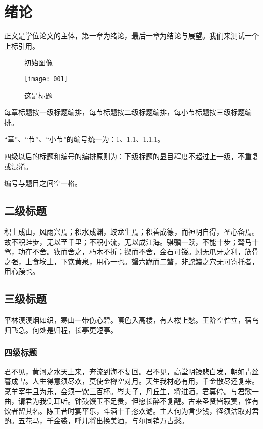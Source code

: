 
\section{绪论}


正文是学位论文的主体，第一章为绪论，最后一章为结论与展望。我们来测试一个上标引用。
\begin{figure}[H]
\centering
\subfigure[原始图像]{\label{figure:001} \texttt{[image: 001]}}
\subfigure[噪声图像（$\mu=0,\sigma=20$)]{\label{figure:002} \texttt{[image: 002]}}
\caption{初始图像}
\end{figure}

 \begin{figure}[h]
 \centering
 \texttt{[image: 001]}
 \caption{这是标题}
 \end{figure}    

    每章标题按一级标题编排，每节标题按二级标题编排，每小节标题按三级标题编排。

    “章”、“节”、“小节”的编号统一为：1、1.1、1.1.1。

    四级以后的标题和编号的编排原则为：下级标题的显目程度不超过上一级，不重复或混淆。

    编号与题目之间空一格。

    \subsection{二级标题}
    

        积土成山，风雨兴焉；积水成渊，蛟龙生焉；积善成德，而神明自得，圣心备焉。故不积跬步，无以至千里；不积小流，无以成江海。骐骥一跃，不能十步；驽马十驾，功在不舍。锲而舍之，朽木不折；锲而不舍，金石可镂。蚓无爪牙之利，筋骨之强，上食埃土，下饮黄泉，用心一也。蟹六跪而二螯，非蛇鳝之穴无可寄托者，用心躁也。
         

        \subsection{三级标题}

        平林漠漠烟如织，寒山一带伤心碧。暝色入高楼，有人楼上愁。王阶空伫立，宿鸟归飞急。何处是归程，长亭更短亭。


            \subsubsection{四级标题}
                
            君不见，黄河之水天上来，奔流到海不复回。君不见，高堂明镜悲白发，朝如青丝暮成雪。人生得意须尽欢，莫使金樽空对月。天生我材必有用，千金散尽还复来。烹羊宰牛且为乐，会须一饮三百杯。岑夫子，丹丘生，将进酒，君莫停。与君歌一曲，请君为我侧耳听。钟鼓馔玉不足贵，但愿长醉不复醒。古来圣贤皆寂寞，惟有饮者留其名。陈王昔时宴平乐，斗酒十千恣欢谑。主人何为言少钱，径须沽取对君酌。五花马，千金裘，呼儿将出换美酒，与尔同销万古愁。

